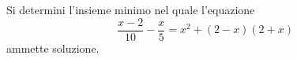 Si determini l'insieme minimo nel quale l'equazione
$$\frac{x-2}{10} - \frac{x}{5} = x^2 + (2-x)(2+x)$$
ammette soluzione.